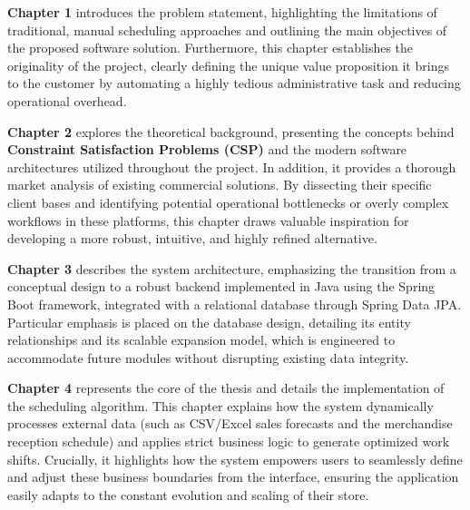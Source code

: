 \noindent \textbf{Chapter 1} introduces the problem statement, highlighting the limitations of traditional, manual scheduling approaches and outlining the main objectives of the proposed software solution.
Furthermore, this chapter establishes the originality of the project, clearly defining the unique value proposition it brings to the customer by automating a highly tedious administrative task and reducing operational overhead.

\vspace{1.5em}

\noindent\textbf {Chapter 2} explores the theoretical background, presenting the concepts behind \textbf{Constraint Satisfaction Problems (CSP)} and the modern software architectures utilized throughout the project.
In addition, it provides a thorough market analysis of existing commercial solutions.
By dissecting their specific client bases and identifying potential operational bottlenecks or overly complex workflows in these platforms, this chapter draws valuable inspiration for developing a more robust, intuitive, and highly refined alternative.

\vspace{1.5em}

\noindent\textbf {Chapter 3} describes the system architecture, emphasizing the transition from a conceptual design to a robust backend implemented in Java using the Spring Boot framework, integrated with a relational database through Spring Data JPA. \\
Particular emphasis is placed on the database design, detailing its entity relationships and its scalable expansion model, which is engineered to accommodate future modules without disrupting existing data integrity.

\vspace{1.5em}

\noindent\textbf {Chapter 4} represents the core of the thesis and details the implementation of the scheduling algorithm.
This chapter explains how the system dynamically processes external data (such as CSV/Excel sales forecasts and the merchandise reception schedule) and applies strict business logic to generate optimized work shifts.
Crucially, it highlights how the system empowers users to seamlessly define and adjust these business boundaries from the interface, ensuring the application easily adapts to the constant evolution and scaling of their store.


